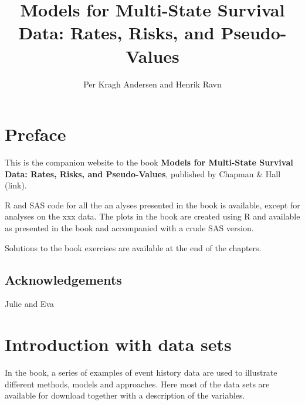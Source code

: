 \documentclass[
  letterpaper,
  DIV=11,
  numbers=noendperiod]{scrreprt}
\title{Models for Multi-State Survival Data: Rates, Risks, and
Pseudo-Values}
\author{Per Kragh Andersen and Henrik Ravn}
\date{}
\renewcommand*\contentsname{Table of contents}
\newcommand\contentsname{Table of contents}
\begin{document}
\maketitle
\ifdefined\Shaded\renewenvironment{Shaded}{\begin{tcolorbox}[frame hidden, borderline west={3pt}{0pt}{shadecolor}, interior hidden, breakable, enhanced, boxrule=0pt, sharp corners]}{\end{tcolorbox}}\fi

\renewcommand*\contentsname{Table of contents}
{
\hypersetup{linkcolor=}
\setcounter{tocdepth}{2}
\tableofcontents
}

\hypertarget{preface}{%
\chapter*{Preface}\label{preface}}


This is the companion website to the book \textbf{Models for Multi-State
Survival Data: Rates, Risks, and Pseudo-Values}, published by Chapman \&
Hall (link).

R and SAS code for all the an alyses presented in the book is available,
except for analyses on the xxx data. The plots in the book are created
using R and available as presented in the book and accompanied with a
crude SAS version.

Solutions to the book exercises are available at the end of the
chapters.

\hypertarget{acknowledgements}{%
\section*{Acknowledgements}\label{acknowledgements}}


Julie and Eva


\hypertarget{introduction-with-data-sets}{%
\chapter{Introduction with data
sets}\label{introduction-with-data-sets}}

In the book, a series of examples of event history data are used to
illustrate different methods, models and approaches. Here most of the
data sets are available for download together with a description of the
variables.
\end{document}

